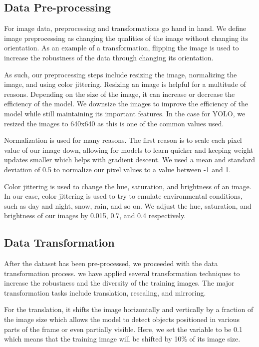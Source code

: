 \documentclass[stu,12pt,floatsintext]{apa7}
\begin{document}
\subsection{Data Pre-processing}
For image data, preprocessing and transformations go hand in hand. We define image preprocessing as changing the qualities of the image without changing its orientation. As an example of a transformation, flipping the image is used to increase the robustness of the data through changing its orientation.

As such, our preprocessing steps include resizing the image, normalizing the image, and using color jittering. Resizing an image is helpful for a multitude of reasons. Depending on the size of the image, it can increase or decrease the efficiency of the model. We downsize the images to improve the efficiency of the model while still maintaining its important features. In the case for YOLO, we resized the images to 640x640 as this is one of the common values used.

Normalization is used for many reasons. The first reason is to scale each pixel value of our image down, allowing for models to learn quicker and keeping weight updates smaller which helps with gradient descent. We used a mean and standard deviation of 0.5 to normalize our pixel values to a value between -1 and 1. 

Color jittering is used to change the hue, saturation, and brightness of an image. In our case, color jittering is used to try to emulate environmental conditions, such as day and night, snow, rain, and so on. We adjust the hue, saturation, and brightness of our images by 0.015, 0.7, and 0.4 respectively.



\subsection{Data Transformation}
After the dataset has been pre-processed, we proceeded with the data transformation process. we have applied several transformation techniques to increase the robustness and the diversity of the training images. The major transformation tasks include translation, rescaling, and mirroring.  

For the translation, it shifts the image horizontally and vertically by a fraction of the image size which allows the model to detect objects positioned in various parts of the frame or even partially visible. Here, we set the variable to be 0.1 which means that the training image will be shifted by 10\% of its image size. 
\end{document}
